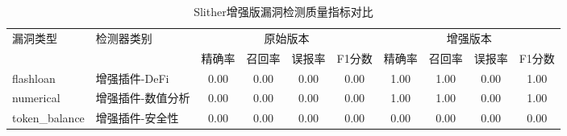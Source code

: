 \begin{table}[h]
\centering
\caption{Slither增强版漏洞检测质量指标对比}
\label{tab:detection_quality}
\begin{tabular}{llcccccccc}
\toprule
\multirow{2}{*}{漏洞类型} & \multirow{2}{*}{检测器类别} & \multicolumn{4}{c}{原始版本} & \multicolumn{4}{c}{增强版本} \\
\cmidrule(lr){3-6} \cmidrule(lr){7-10}
& & 精确率 & 召回率 & 误报率 & F1分数 & 精确率 & 召回率 & 误报率 & F1分数 \\
\midrule
flashloan & 增强插件-DeFi & 0.00 & 0.00 & 0.00 & 0.00 & 1.00 & 1.00 & 0.00 & 1.00 \\
numerical & 增强插件-数值分析 & 0.00 & 0.00 & 0.00 & 0.00 & 1.00 & 1.00 & 0.00 & 1.00 \\
token_balance & 增强插件-安全性 & 0.00 & 0.00 & 0.00 & 0.00 & 0.00 & 0.00 & 0.00 & 0.00 \\
\bottomrule
\end{tabular}
\end{table}